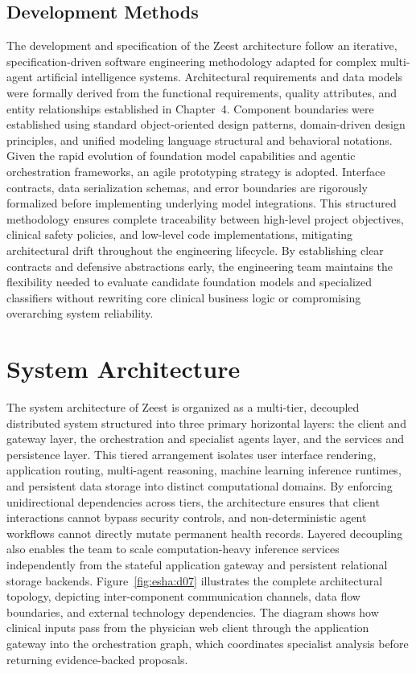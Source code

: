 \subsection{ Development Methods}
The development and specification of the Zeest architecture follow an iterative, specification-driven software engineering methodology adapted for complex multi-agent artificial intelligence systems. Architectural requirements and data models were formally derived from the functional requirements, quality attributes, and entity relationships established in Chapter~4. Component boundaries were established using standard object-oriented design patterns, domain-driven design principles, and unified modeling language structural and behavioral notations. Given the rapid evolution of foundation model capabilities and agentic orchestration frameworks, an agile prototyping strategy is adopted. Interface contracts, data serialization schemas, and error boundaries are rigorously formalized before implementing underlying model integrations. This structured methodology ensures complete traceability between high-level project objectives, clinical safety policies, and low-level code implementations, mitigating architectural drift throughout the engineering lifecycle. By establishing clear contracts and defensive abstractions early, the engineering team maintains the flexibility needed to evaluate candidate foundation models and specialized classifiers without rewriting core clinical business logic or compromising overarching system reliability.

\section{System Architecture}
The system architecture of Zeest is organized as a multi-tier, decoupled distributed system structured into three primary horizontal layers: the client and gateway layer, the orchestration and specialist agents layer, and the services and persistence layer. This tiered arrangement isolates user interface rendering, application routing, multi-agent reasoning, machine learning inference runtimes, and persistent data storage into distinct computational domains. By enforcing unidirectional dependencies across tiers, the architecture ensures that client interactions cannot bypass security controls, and non-deterministic agent workflows cannot directly mutate permanent health records. Layered decoupling also enables the team to scale computation-heavy inference services independently from the stateful application gateway and persistent relational storage backends. Figure~\ref{fig:esha:d07} illustrates the complete architectural topology, depicting inter-component communication channels, data flow boundaries, and external technology dependencies. The diagram shows how clinical inputs pass from the physician web client through the application gateway into the orchestration graph, which coordinates specialist analysis before returning evidence-backed proposals.

